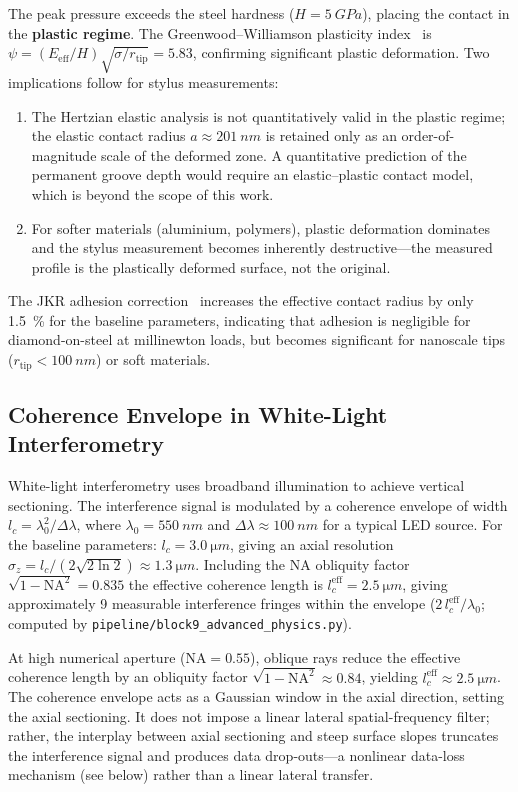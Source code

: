 \documentclass[review,12pt]{elsarticle}
\begin{document}
The peak pressure exceeds the steel hardness ($H = \SI{5}{GPa}$), placing the contact in the \textbf{plastic regime}. The Greenwood--Williamson plasticity index~\cite{greenwood1966contact} is $\psi = (E_\mathrm{eff}/H)\sqrt{\sigma/r_\mathrm{tip}} = 5.83$, confirming significant plastic deformation. Two implications follow for stylus measurements:
\begin{enumerate}
    \item The Hertzian elastic analysis is not quantitatively valid in the plastic regime; the elastic contact radius $a \approx \SI{201}{nm}$ is retained only as an order-of-magnitude scale of the deformed zone. A quantitative prediction of the permanent groove depth would require an elastic--plastic contact model, which is beyond the scope of this work.
    \item For softer materials (aluminium, polymers), plastic deformation dominates and the stylus measurement becomes inherently destructive---the measured profile is the plastically deformed surface, not the original.
\end{enumerate}
The JKR adhesion correction~\cite{johnson1971surface} increases the effective contact radius by only \SI{1.5}{\percent} for the baseline parameters, indicating that adhesion is negligible for diamond-on-steel at millinewton loads, but becomes significant for nanoscale tips ($r_\mathrm{tip} < \SI{100}{nm}$) or soft materials.

\subsection{Coherence Envelope in White-Light Interferometry}

White-light interferometry uses broadband illumination to achieve vertical sectioning. The interference signal is modulated by a coherence envelope of width $l_c = \lambda_0^2/\Delta\lambda$, where $\lambda_0 = \SI{550}{nm}$ and $\Delta\lambda \approx \SI{100}{nm}$ for a typical LED source. For the baseline parameters: $l_c = \SI{3.0}{\micro m}$, giving an axial resolution $\sigma_z = l_c/(2\sqrt{2\ln 2}) \approx \SI{1.3}{\micro m}$. Including the NA obliquity factor $\sqrt{1-\mathrm{NA}^2} = 0.835$ the effective coherence length is $l_c^{\mathrm{eff}} = \SI{2.5}{\micro m}$, giving approximately 9 measurable interference fringes within the envelope ($2\,l_c^{\mathrm{eff}}/\lambda_0$; computed by \texttt{pipeline/block9\_advanced\_physics.py}).

At high numerical aperture ($\mathrm{NA} = 0.55$), oblique rays reduce the effective coherence length by an obliquity factor $\sqrt{1-\mathrm{NA}^2} \approx 0.84$, yielding $l_c^\mathrm{eff} \approx \SI{2.5}{\micro m}$. The coherence envelope acts as a Gaussian window in the axial direction, setting the axial sectioning. It does not impose a linear lateral spatial-frequency filter; rather, the interplay between axial sectioning and steep surface slopes truncates the interference signal and produces data drop-outs---a nonlinear data-loss mechanism (see below) rather than a linear lateral transfer.
\end{document}
